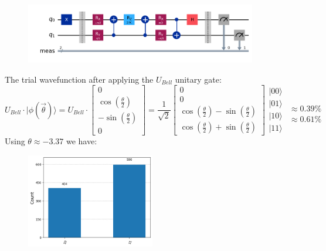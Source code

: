\documentclass{article}
\begin{document}
\begin{figure}[H]
	\centering
	\includegraphics[width=0.9\textwidth, height=0.25\textheight]{BellM.png}
\end{figure}
The trial wavefunction after applying the \(U_{Bell}\) unitary gate:
\begin{equation*}
	U_{Bell} \cdot |\phi(\vec{\theta})\rangle = U_{Bell} \cdot \begin{bmatrix}
		0                                  \\
		\cos\left(\frac{\theta}{2}\right)  \\
		-\sin\left(\frac{\theta}{2}\right) \\
		0
	\end{bmatrix}
	= \frac{1}{\sqrt{2}}
	\begin{bmatrix}
		0                                                                     \\
		0                                                                     \\
		\cos\left(\frac{\theta}{2}\right) - \sin\left(\frac{\theta}{2}\right) \\
		\cos\left(\frac{\theta}{2}\right) + \sin\left(\frac{\theta}{2}\right)
	\end{bmatrix}
	\begin{array}{c}
		|00 \rangle \\
		|01 \rangle \\
		|10 \rangle \\
		|11 \rangle
	\end{array}
	\begin{array}{c}
		\\
		\\
		\approx 0.39\% \\
		\approx 0.61\%
	\end{array}
\end{equation*}
Using \(\theta \approx -3.37\) we have:
\begin{figure}[H]
	\centering
	\includegraphics[width=0.5\textwidth, height=0.3\textheight]{BellHis.png}
\end{figure}
\end{document}
